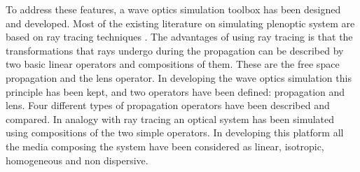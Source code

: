 To address these features, a wave optics simulation toolbox has been designed and developed. Most of the existing literature on simulating plenoptic system are based on ray tracing techniques \cite{thurow2013recent,lynch2011development,lynch2012three,ng2006digital,levoy1996light}. The advantages of using ray tracing is that the transformations that rays undergo during the propagation can be described by two basic linear operators and compositions of them. These are the free space propagation and the lens operator. In developing the wave optics simulation this principle has been kept, and two operators have been defined: propagation and lens. Four different types of propagation operators have been described and compared. In analogy with ray tracing an optical system has been simulated using compositions of the two simple operators. In developing this platform all the media composing the system have been considered as linear, isotropic, homogeneous and non dispersive. 
